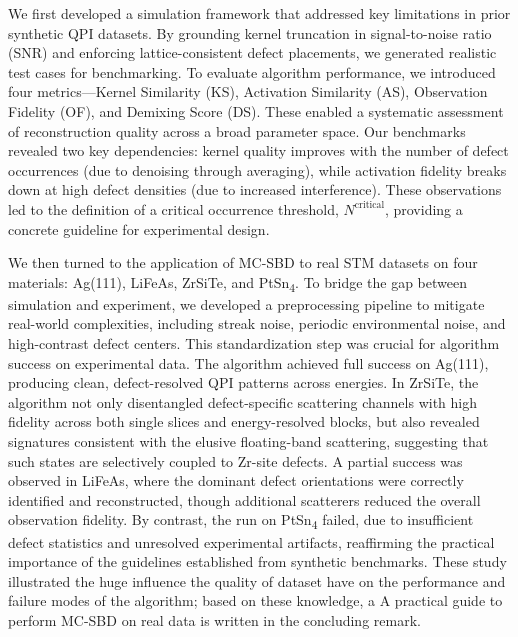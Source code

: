 We first developed a simulation framework that addressed key limitations in prior synthetic QPI datasets. By grounding kernel truncation in signal-to-noise ratio (SNR) and enforcing lattice-consistent defect placements, we generated realistic test cases for benchmarking. To evaluate algorithm performance, we introduced four metrics—Kernel Similarity (KS), Activation Similarity (AS), Observation Fidelity (OF), and Demixing Score (DS). These enabled a systematic assessment of reconstruction quality across a broad parameter space. Our benchmarks revealed two key dependencies: kernel quality improves with the number of defect occurrences (due to denoising through averaging), while activation fidelity breaks down at high defect densities (due to increased interference). These observations led to the definition of a critical occurrence threshold, $N^{\text{critical}}$, providing a concrete guideline for experimental design. 

We then turned to the application of \ac{MC-SBD} to real STM datasets on four materials: Ag(111), LiFeAs, ZrSiTe, and PtSn\textsubscript{4}. To bridge the gap between simulation and experiment, we developed a preprocessing pipeline to mitigate real-world complexities, including streak noise, periodic environmental noise, and high-contrast defect centers. This standardization step was crucial for algorithm success on experimental data. The algorithm achieved full success on Ag(111), producing clean, defect-resolved QPI patterns across energies. In ZrSiTe, the algorithm not only disentangled defect-specific scattering channels with high fidelity across both single slices and energy-resolved blocks, but also revealed signatures consistent with the elusive floating-band scattering, suggesting that such states are selectively coupled to Zr-site defects. A partial success was observed in LiFeAs, where the dominant defect orientations were correctly identified and reconstructed, though additional scatterers reduced the overall observation fidelity. By contrast, the run on PtSn\textsubscript{4} failed, due to insufficient defect statistics and unresolved experimental artifacts, reaffirming the practical importance of the guidelines established from synthetic benchmarks. These study illustrated the huge influence the quality of dataset have on the performance and failure modes of the algorithm; based on these knowledge, a A practical guide to perform MC-SBD on real data is written in the concluding remark. 